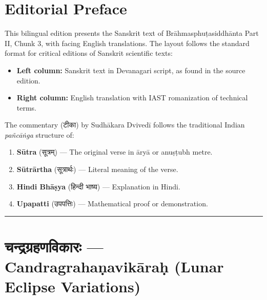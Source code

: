 \documentclass[11pt,a4paper]{article}
\newcommand{\dev}[1]{{\devanagarifont #1}}
\begin{document}
\tableofcontents
\newpage

\section*{Editorial Preface}

This bilingual edition presents the Sanskrit text of Brāhmasphuṭasiddhānta Part II, Chunk 3, with facing English translations. The layout follows the standard format for critical editions of Sanskrit scientific texts:

\begin{itemize}
  \item \textbf{Left column:} Sanskrit text in Devanagari script, as found in the source edition.
  \item \textbf{Right column:} English translation with IAST romanization of technical terms.
\end{itemize}

The commentary (\dev{टीका}) by Sudhākara Dvivedī follows the traditional Indian \emph{pañcāṅga} structure of:
\begin{enumerate}
  \item \textbf{Sūtra} (\dev{सूत्रम्}) — The original verse in āryā or anuṣṭubh metre.
  \item \textbf{Sūtrārtha} (\dev{सूत्रार्थः}) — Literal meaning of the verse.
  \item \textbf{Hindi Bhāṣya} (\dev{हिन्दी भाष्य}) — Explanation in Hindi.
  \item \textbf{Upapatti} (\dev{उपपत्तिः}) — Mathematical proof or demonstration.
\end{enumerate}

\medskip
\noindent\rule{\textwidth}{0.4pt}

\newpage

\section{\texorpdfstring{{\devanagarifont चन्द्रग्रहणविकारः} — Candragrahaṇavikāraḥ (Lunar Eclipse Variations)}{Candragrahaṇavikāraḥ (Lunar Eclipse Variations)}}
\label{sec:chandra-grahana}
\end{document}

